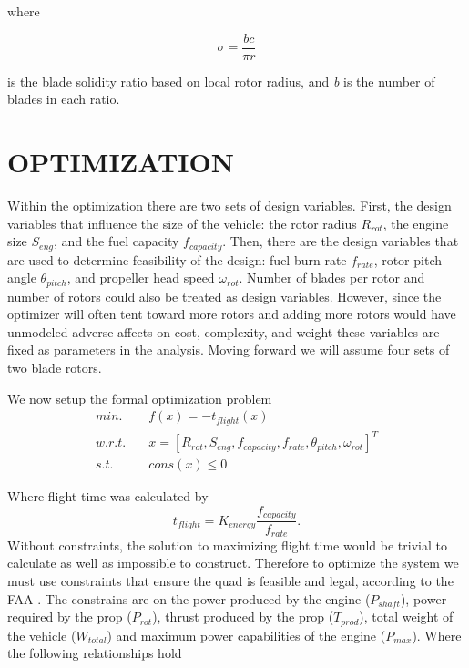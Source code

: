 \documentclass[letterpaper, 10 pt, conference]{ieeeconf}  %
\newcommand{\of}[1]{\ensuremath{\left(#1\right)}}
\begin{document}
where 

\[ \sigma = \frac{bc}{\pi r} \]

is the blade solidity ratio based on local rotor radius, and \textit{b} is the number of blades in each ratio. 


\section{OPTIMIZATION}

Within the optimization there are two sets of design variables.  First, the design variables that influence the size of the vehicle: the rotor radius $R_{rot}$, the engine size $S_{eng}$, and the fuel capacity $f_{capacity}$.  Then, there are the design variables that are used to determine feasibility of the design: fuel burn rate $f_{rate}$, rotor pitch angle $\theta_{pitch}$, and propeller head speed $\omega_{rot}$. Number of blades per rotor and number of rotors could also be treated as design variables. However, since the optimizer will often tent toward more rotors and adding more rotors would have unmodeled adverse affects on cost, complexity, and weight these variables are fixed as parameters in the analysis. Moving forward we will assume four sets of two blade rotors.


We now setup the formal optimization problem
\begin{equation}
	\begin{split}
		min. & \quad f\of{x} = -t_{flight}\of{x} \\
		w.r.t. & \quad x = [R_{rot}, S_{eng}, f_{capacity}, f_{rate}, \theta_{pitch}, \omega_{rot}]^T \\
		s.t. & \quad cons\of{x} \leq 0 
	\end{split}
	\label{eq:objective}
\end{equation}

Where flight time was calculated by 
\[
	t_{flight} = K_{energy}\frac{f_{capacity}}{f_{rate}}.
\]
Without constraints, the solution to maximizing flight time would be trivial to calculate as well as impossible to construct. Therefore to optimize the system we must use constraints that ensure the quad is feasible and legal, according to the FAA \cite{faa2016}. The constrains are on the power produced by the engine ($P_{shaft}$), power required by the prop ($P_{rot}$), thrust produced by the prop ($T_{prod}$), total weight of the vehicle ($W_{total}$) and maximum power capabilities of the engine ($P_{max}$). Where the following relationships hold
\end{document}
